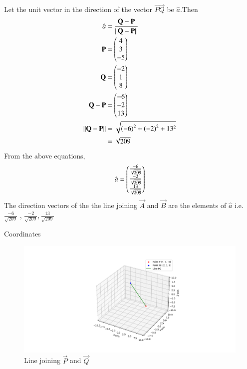 \documentclass[journal]{IEEEtran}
\begin{document}
\solution
Let the unit vector in the direction of the vector $\vec{PQ}$ be $\hat{a}$.Then \\
\begin{align}
    \hat{a} &= \frac{\mathbf{Q}-\mathbf{P}}{||\mathbf{Q}-\mathbf{P}||} \\
    \mathbf{P} &= \begin{pmatrix}4 \\ 3 \\ -5\end{pmatrix} \\
    \mathbf{Q} &= \begin{pmatrix}-2 \\ 1 \\8\end{pmatrix} \\
    \mathbf{Q}-\mathbf{P} &= \begin{pmatrix}-6 \\ -2 \\ 13\end{pmatrix} \\
	||\mathbf{Q}-\mathbf{P}|| &= \sqrt{\left(-6\right)^2 + \left(-2\right)^2 + 13^2} \notag \\
    &= \sqrt{209} 
\end{align}
From the above equations, \\
\begin{align}
    \hat{a} = \begin{pmatrix} \frac{-6}{\sqrt{209}} \\ \frac{-2}{\sqrt{209}} \\ \frac{13}{\sqrt{209}}\end{pmatrix}
\end{align}
The direction vectors of the the line joining $\vec{A}$ and $\vec{B}$ are the elements of $\hat{a}$ i.e. $\frac{-6}{\sqrt{209}}$ , $\frac{-2}{\sqrt{209}} , \frac{13}{\sqrt{209}}$
 \begin{table}[H]
      \centering
      
      \caption{Coordinates}
      \label{}
  \end{table}
  \begin{figure}[h!]
   \centering
   \includegraphics[width=1\linewidth]{Figures/Figure_1.png}
	  \caption{Line joining $\vec{P}$ and $\vec{Q}$}
   \label{stemplot}
\end{figure}
\end{document}
